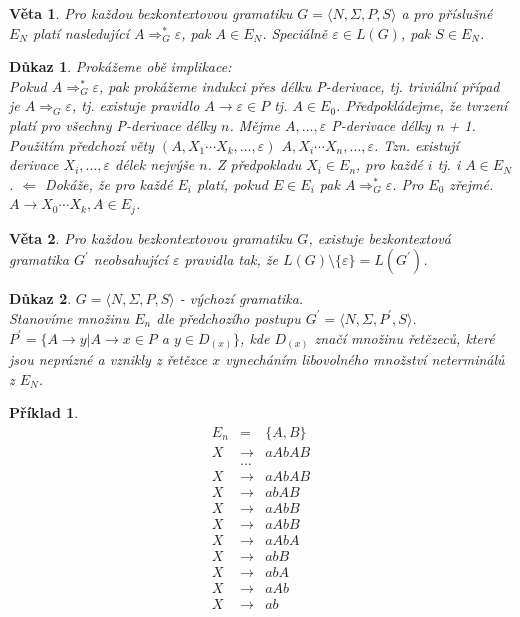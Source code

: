 \documentclass[10pt, a4paper, titlepage]{article}
\theoremstyle{note}
\newtheorem{veta}{\textbf{Věta}}
\newtheorem{dukaz}{\textbf{Důkaz}}
\newtheorem{priklad}{\textbf{Příklad}}
\begin{document}
\begin{veta}
Pro každou bezkontextovou gramatiku $G = \langle N, \Sigma, P,S \rangle$ a pro příslušné $E_{N}$ platí nasledující $A \Rightarrow_{G}^{*}\varepsilon$, pak $A \in E_{N}$. 
Speciálně $\varepsilon \in L(G)$, pak $S \in E_{N}$.
\end{veta}

\begin{dukaz}
Prokážeme obě implikace: \\
Pokud $A \Rightarrow_{G}^{*}\varepsilon$, pak prokážeme indukci přes délku P-derivace, tj. triviální případ je $A \Rightarrow_{G}\varepsilon$, 
tj. existuje pravidlo $A \rightarrow \varepsilon \in P$ tj. $A \in E_{0}$.
Předpokládejme, že tvrzení platí pro všechny P-derivace délky $n$.
Mějme $A, \ldots, \varepsilon$ P-derivace délky n + 1. Použitím předchozí věty $(A, X_{1} \cdots X_{k}, \ldots, \varepsilon)$ $A, X_{i} \cdots X_{n}, \ldots, \varepsilon$.
Tzn. existují derivace $X_{i}, \ldots, \varepsilon$ délek nejvýše $n$. Z předpokladu $X_{i} \in E_{n}$, pro každé $i$ tj. i $A \in E_{N}$. 
$\Leftarrow$ Dokáže, že pro každé $E_{i}$ platí, pokud $E \in E_{i}$ pak $A \Rightarrow_{G}^{*}\varepsilon$. Pro $E_{0}$ zřejmé.
$A \rightarrow X_{0} \cdots X_{k}, A \in E_{j}$.
\end{dukaz}

\begin{veta}
Pro každou bezkontextovou gramatiku $G$, existuje bezkontextová gramatika $G^{'}$ neobsahující $\varepsilon$ pravidla tak, že $L(G) \setminus \lbrace \varepsilon \rbrace = L(G^{'})$.
\end{veta}

\begin{dukaz}
$G = \langle N, \Sigma, P,S \rangle$ - výchozí gramatika.\\
Stanovíme množinu $E_{n}$ dle předchozího postupu $G^{'} = \langle N, \Sigma, P^{'},S \rangle$.
$P^{'} = \lbrace A \rightarrow y|A \rightarrow x \in P$ a $y \in D_{(x)} \rbrace$, kde $D_{(x)}$ značí množinu řetězeců, které jsou neprázné 
a vznikly z řetězce $x$ vynecháním libovolného množství neterminálů z $E_{N}$.
\end{dukaz}

\begin{priklad}
\begin{eqnarray*}
E_{n} &=& \lbrace A, B \rbrace \\
X &\rightarrow& aAbAB \\
&\ldots& \\
X &\rightarrow& aAbAB \\
X &\rightarrow& abAB \\
X &\rightarrow& aAbB \\
X &\rightarrow& aAbB \\
X &\rightarrow& aAbA \\
X &\rightarrow& abB \\
X &\rightarrow& abA \\
X &\rightarrow& aAb \\
X &\rightarrow& ab
\end{eqnarray*}
\end{priklad}
\end{document}
